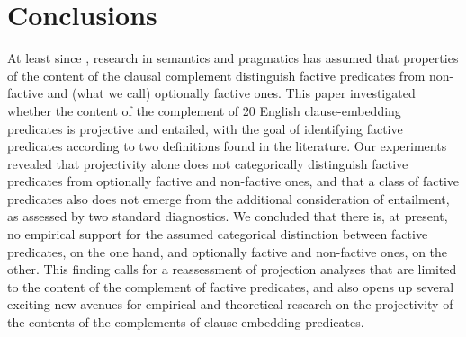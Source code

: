 \documentclass[11pt,fleqn]{article}
\newcommand{\6}{\mbox{$[\hspace*{-.6mm}[$}}
\newcommand{\9}{\mbox{$]\hspace*{-.6mm}]$}}
\begin{document}
{\section{Conclusions}\label{s5}

At least since \citealt{kiparsky-kiparsky70}, research in semantics and pragmatics has assumed that properties of the content of the clausal complement distinguish factive predicates from non-factive and (what we call) optionally factive ones. This paper investigated whether the content of the complement of 20 English clause-embedding predicates is projective and entailed, with the goal of identifying factive predicates according to two definitions found in the literature. Our experiments revealed that projectivity alone does not categorically distinguish factive predicates from optionally factive and non-factive ones, and that a class of factive predicates also does not emerge from the additional consideration of entailment, as assessed by two standard diagnostics. We concluded that there is, at present, no empirical support for the assumed categorical distinction between factive predicates, on the one hand, and optionally factive and non-factive ones, on the other. This finding calls for a reassessment of projection analyses that are limited to the content of the complement of factive predicates, and also opens up several exciting new avenues for empirical and theoretical research on the projectivity of the contents of the complements of clause-embedding predicates.




\appendix

\setcounter{table}{0}
\renewcommand{\thetable}{A\arabic{table}}

\setcounter{figure}{0}
\renewcommand{\thefigure}{A\arabic{figure}}

}
\end{document}

